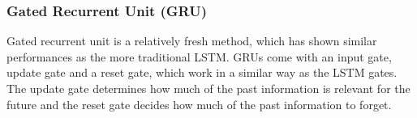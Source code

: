 \subsubsection*{Gated Recurrent Unit (GRU)}
Gated recurrent unit is a relatively fresh method, which has shown similar performances as the more traditional LSTM. GRUs come with an input gate, update gate and a reset gate, which work in a similar way as the LSTM gates. The update gate determines how much of the past information is relevant for the future and the reset gate decides how much of the past information to forget. \cite{gru}
